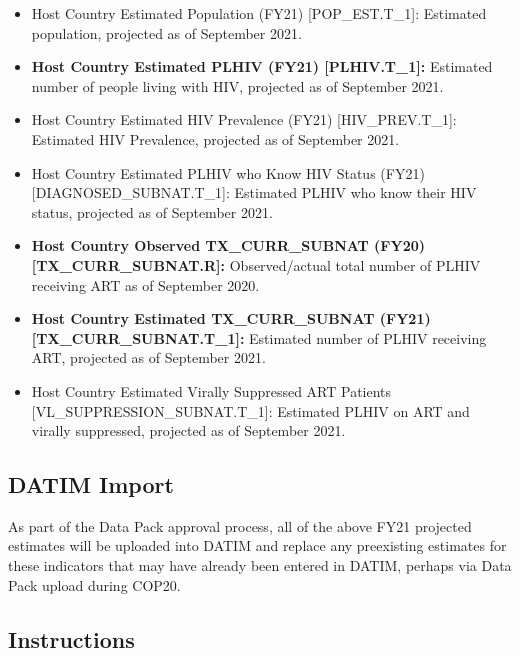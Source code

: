 \documentclass[
  openany]{book}
\begin{document}
\begin{itemize}
\item
  Host Country Estimated Population (FY21) {[}POP\_EST.T\_1{]}: Estimated
  population, projected as of September 2021.
\item
  \textbf{Host Country Estimated PLHIV (FY21) {[}PLHIV.T\_1{]}:} Estimated
  number of people living with HIV, projected as of September 2021.
\item
  Host Country Estimated HIV Prevalence (FY21) {[}HIV\_PREV.T\_1{]}:
  Estimated HIV Prevalence, projected as of September 2021.
\item
  Host Country Estimated PLHIV who Know HIV Status (FY21)
  {[}DIAGNOSED\_SUBNAT.T\_1{]}: Estimated PLHIV who know their HIV status,
  projected as of September 2021.
\item
  \textbf{Host Country Observed TX\_CURR\_SUBNAT (FY20)
  {[}TX\_CURR\_SUBNAT.R{]}:} Observed/actual total number of PLHIV
  receiving ART as of September 2020.
\item
  \textbf{Host Country Estimated TX\_CURR\_SUBNAT (FY21)
  {[}TX\_CURR\_SUBNAT.T\_1{]}:} Estimated number of PLHIV receiving ART,
  projected as of September 2021.
\item
  Host Country Estimated Virally Suppressed ART Patients
  {[}VL\_SUPPRESSION\_SUBNAT.T\_1{]}: Estimated PLHIV on ART and virally
  suppressed, projected as of September 2021.
\end{itemize}

\hypertarget{datim-import-1}{%
\subsection{DATIM Import}\label{datim-import-1}}

As part of the Data Pack approval process, all of the above FY21
projected estimates will be uploaded into DATIM and replace any
preexisting estimates for these indicators that may have already been
entered in DATIM, perhaps via Data Pack upload during COP20.

\hypertarget{instructions-1}{%
\subsection{Instructions}\label{instructions-1}}
\end{document}
